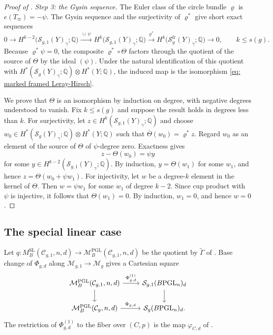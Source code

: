 \documentclass[11pt,reqno]{amsart}
\theoremstyle{plain} %
\theoremstyle{definition}
\newcommand{\QQ}{\mathbb{Q}}
\newcommand{\M}{\mathcal{M}}
\newcommand{\C}{\mathcal{C}}
\DeclareMathOperator{\SL}{SL}
\DeclareMathOperator{\PGL}{PGL}
\newcommand{\BPGL}{B\mathrm{PGL}}
\newcommand{\Sc}{\mathcal{S}}
\begin{document}
\begin{proof}[Proof of ]
\smallskip

\noindent\emph{Step 3: the Gysin sequence.} The Euler class of the circle bundle $\varrho$ is $e(T_\varpi)=-\psi$. The Gysin sequence and the surjectivity of $\varrho^*$ give short exact sequences
\[
0\longrightarrow H^{k-2}\big(\Sc_{g,1}(Y)_\gamma;\QQ\big)\xrightarrow{\ \cup\,\psi\ }H^k\big(\Sc_{g,1}(Y)_\gamma;\QQ\big)\xrightarrow{\ \varrho^*\ }H^k\big(\Sc^{\mathrm{fr}}_g(Y)_\gamma;\QQ\big)\longrightarrow0,
\qquad k\leq s(g).
\]
Because $\varrho^*\psi=0$, the composite $\varrho^*\circ\Theta$ factors through the quotient of the source of $\Theta$ by the ideal $(\psi)$. Under the natural identification of this quotient with $H^*(\Sc_g(Y)_\gamma;\QQ)\otimes H^*(Y;\QQ)$, the induced map is the isomorphism \eqref{eq: marked framed Leray-Hirsch}.

We prove that $\Theta$ is an isomorphism by induction on degree, with negative degrees understood to vanish. Fix $k\leq s(g)$ and suppose the result holds in degrees less than $k$. For surjectivity, let $z\in H^k(\Sc_{g,1}(Y)_\gamma;\QQ)$ and choose $w_0\in H^*(\Sc_g(Y)_\gamma;\QQ)\otimes H^*(Y;\QQ)$ such that $\overline\Theta(w_0)=\varrho^*z$. Regard $w_0$ as an element of the source of $\Theta$ of $\psi$-degree zero. Exactness gives
\[
z-\Theta(w_0)=\psi y
\]
for some $y\in H^{k-2}(\Sc_{g,1}(Y)_\gamma;\QQ)$. By induction, $y=\Theta(w_1)$ for some $w_1$, and hence $z=\Theta(w_0+\psi w_1)$. For injectivity, let $w$ be a degree-$k$ element in the kernel of $\Theta$. Then $w=\psi w_1$ for some $w_1$ of degree $k-2$. Since cup product with $\psi$ is injective, it follows that $\Theta(w_1)=0$. By induction, $w_1=0$, and hence $w=0$.
\end{proof}

\subsection{The special linear case} \label{subsec: SL ring}

Let $q\colon M_B^{\SL}(\C_{g,1},n,d)\to
\M_B^{\PGL}(\C_{g,1},n,d)$ 
be the quotient by $\widetilde\Gamma$ of . Base change of $\Phi_{g,d}$ along $\M_{g,1}\to\M_g$ gives a Cartesian square
\[
\begin{tikzcd}
\M_B^{\PGL}(\C_{g,1},n,d)
    \arrow[r,"\Phi^{(1)}_{g,d}"]
    \arrow[d]
&
\Sc_{g,1}(\BPGL_n)_d
    \arrow[d]
\\
\M_B^{\PGL}(\C_g,n,d)
    \arrow[r,"\Phi_{g,d}"]
&
\Sc_g(\BPGL_n)_d .
\end{tikzcd}
\]
The restriction of $\Phi^{(1)}_{g,d}$ to the fiber over $(C,p)$ is the map $\varphi_{C,d}$ of .
\end{document}
